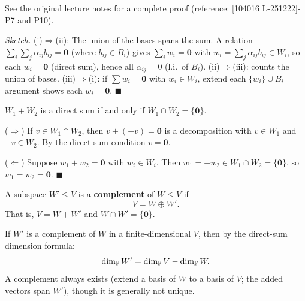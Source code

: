 \begin{proofbox}
See the original lecture notes for a complete proof
(reference: [104016 L-251222]-P7 and P10).

\medskip\noindent
\textit{Sketch.}
(i)$\Rightarrow$(ii): The union of the bases spans the sum.  A relation
$\sum_i\sum_j\alpha_{ij}b_{ij}=\mathbf{0}$ (where $b_{ij}\in B_i$) gives
$\sum_i w_i=\mathbf{0}$ with $w_i=\sum_j\alpha_{ij}b_{ij}\in W_i$, so
each $w_i=\mathbf{0}$ (direct sum), hence all $\alpha_{ij}=0$ (l.i.\ of $B_i$).
(ii)$\Rightarrow$(iii): counts the union of bases.
(iii)$\Rightarrow$(i): if $\sum w_i=\mathbf{0}$ with $w_i\in W_i$, extend each
$\{w_i\}\cup B_i$ argument shows each $w_i=\mathbf{0}$.
\hfill$\blacksquare$
\end{proofbox}

\begin{propbox}
\label{prop:direct-sum-two}
$W_1 + W_2$ is a direct sum if and only if $W_1\cap W_2=\{\mathbf{0}\}$.
\end{propbox}

\begin{proofbox}
($\Rightarrow$) If $v\in W_1\cap W_2$, then $v+(-v)=\mathbf{0}$ is a
decomposition with $v\in W_1$ and $-v\in W_2$.  By the direct-sum condition
$v=\mathbf{0}$.

($\Leftarrow$) Suppose $w_1+w_2=\mathbf{0}$ with $w_i\in W_i$.  Then
$w_1=-w_2\in W_1\cap W_2=\{\mathbf{0}\}$, so $w_1=w_2=\mathbf{0}$.
\hfill$\blacksquare$
\end{proofbox}

\begin{defbox}
\label{def:complement}
A subspace $W'\leq V$ is a \textbf{complement} of $W\leq V$ if
\[
    V = W \oplus W'.
\]
That is, $V = W+W'$ and $W\cap W'=\{\mathbf{0}\}$.
\end{defbox}

\begin{tipbox}
If $W'$ is a complement of $W$ in a finite-dimensional $V$, then by the
direct-sum dimension formula:
\[
    \operatorname{dim}_{\mathbb{F}} W' = \operatorname{dim}_{\mathbb{F}} V - \operatorname{dim}_{\mathbb{F}} W.
\]
A complement always exists (extend a basis of $W$ to a basis of $V$; the
added vectors span $W'$), though it is generally not unique.
\end{tipbox}
